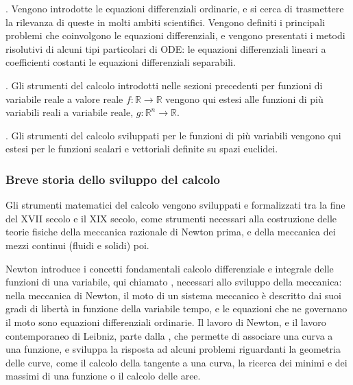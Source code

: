 \documentclass[letterpaper,10pt,italian]{jupyterBook}
\begin{document}
\sphinxAtStartPar
{\hyperref[\detokenize{ch/ode:ode-hs}]{}}. Vengono introdotte le equazioni differenziali ordinarie, e si cerca di trasmettere la rilevanza di queste in molti ambiti scientifici. Vengono definiti i principali problemi che coinvolgono le equazioni differenziali, e vengono presentati i metodi risolutivi di alcuni tipi particolari di ODE: le equazioni differenziali lineari a coefficienti costanti le equazioni differenziali separabili.

\sphinxAtStartPar
{\hyperref[\detokenize{ch/multivariable-calculus:multivariable-calculus}]{}}. Gli strumenti del calcolo introdotti nelle sezioni precedenti per funzioni di variabile reale a valore reale \(f: \mathbb{R} \rightarrow \mathbb{R}\) vengono qui estesi alle funzioni di più variabili reali a variabile reale, \(g: \mathbb{R}^n \rightarrow \mathbb{R}\).

\sphinxAtStartPar
{\hyperref[\detokenize{ch/vector-calculus:vector-calculus}]{}}. Gli strumenti del calcolo sviluppati per le funzioni di più variabili vengono qui estesi per le funzioni scalari e vettoriali definite su spazi euclidei.


\subsubsection*{Breve storia dello sviluppo del calcolo}

\sphinxAtStartPar
Gli strumenti matematici del calcolo vengono sviluppati e formalizzati tra la fine del XVII secolo e il XIX secolo, come strumenti necessari alla costruzione delle teorie fisiche della meccanica razionale di Newton prima, e della meccanica dei mezzi continui (fluidi e solidi) poi.

\sphinxAtStartPar
Newton introduce i concetti fondamentali calcolo differenziale e integrale delle funzioni di una variabile, qui chiamato {\hyperref[\detokenize{ch/infinitesimal_calculus/analysis:infinitesimal-calculus-analysis}]{}}, necessari allo sviluppo della meccanica: nella meccanica di Newton, il moto di un sistema meccanico è descritto dai suoi gradi di libertà in funzione della variabile tempo, e le equazioni che ne governano il moto sono equazioni differenziali ordinarie. Il lavoro di Newton, e il lavoro contemporaneo di Leibniz, parte dalla {\hyperref[\detokenize{ch/analytic_geometry:geometry-analytic}]{}}, che permette di associare una curva a una funzione, e sviluppa la risposta ad alcuni problemi riguardanti la geometria delle curve, come il calcolo della tangente a una curva, la ricerca dei minimi e dei massimi di una funzione o il calcolo delle aree.
\end{document}
